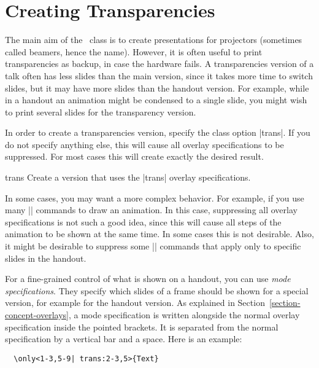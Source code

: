 %
%
%

\section{Creating Transparencies}
\label{section-trans}
\label{trans}

The main aim of the \beamer\ class is to create presentations for projectors (sometimes called beamers, hence the name). However, it is often useful to print transparencies as backup, in case the hardware fails. A transparencies version of a talk often has less slides than the main version, since it takes more time to switch slides, but it may have more slides than the handout version. For example, while in a handout an animation might be condensed to a single slide, you might wish to print several slides for the transparency version.

In order to create a transparencies version, specify the class option |trans|. If you do not specify anything else, this will cause all overlay specifications to be suppressed. For most cases this will create exactly the desired result.

\begin{classoption}{trans}
  Create a version that uses the |trans| overlay specifications.
\end{classoption}

In some cases, you may want a more complex behavior. For example, if you use many |\only| commands to draw an animation. In this case, suppressing all overlay specifications is not such a good idea, since this will cause all steps of the animation to be shown at the same time. In some cases this is not desirable. Also, it might be desirable to suppress some |\alert| commands that apply only to specific slides in the handout.

For a fine-grained control of what is shown on a handout, you can use \emph{mode specifications}. They specify which slides of a frame should be shown for a special version, for example for the handout version. As explained in Section~\ref{section-concept-overlays}, a mode specification is written alongside the normal overlay specification inside the pointed brackets. It is separated from the normal specification by a vertical bar and a space. Here is an example:
\begin{verbatim}
  \only<1-3,5-9| trans:2-3,5>{Text}
\end{verbatim}

